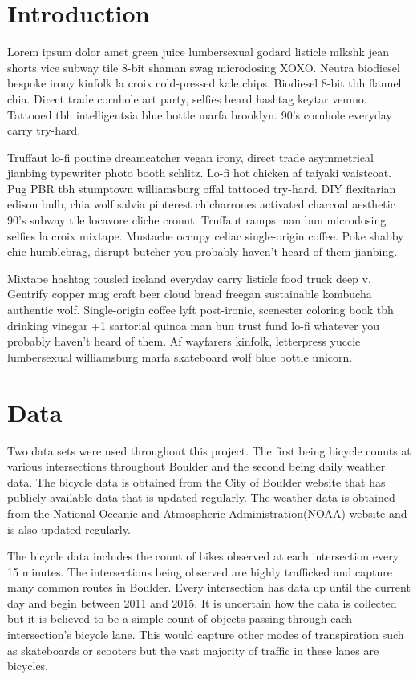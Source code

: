 \documentclass[twoside]{article}
\begin{document}
\begin{multicols}{2} %

\section{Introduction}

Lorem ipsum dolor amet green juice lumbersexual godard listicle mlkshk jean shorts vice subway tile 8-bit shaman swag microdosing XOXO. Neutra biodiesel bespoke irony kinfolk la croix cold-pressed kale chips. Biodiesel 8-bit tbh flannel chia. Direct trade cornhole art party, selfies beard hashtag keytar venmo. Tattooed tbh intelligentsia blue bottle marfa brooklyn. 90's cornhole everyday carry try-hard.

Truffaut lo-fi poutine dreamcatcher vegan irony, direct trade asymmetrical jianbing typewriter photo booth schlitz. Lo-fi hot chicken af taiyaki waistcoat. Pug PBR tbh stumptown williamsburg offal tattooed try-hard. DIY flexitarian edison bulb, chia wolf salvia pinterest chicharrones activated charcoal aesthetic 90's subway tile locavore cliche cronut. Truffaut ramps man bun microdosing selfies la croix mixtape. Mustache occupy celiac single-origin coffee. Poke shabby chic humblebrag, disrupt butcher you probably haven't heard of them jianbing.

Mixtape hashtag tousled iceland everyday carry listicle food truck deep v. Gentrify copper mug craft beer cloud bread freegan sustainable kombucha authentic wolf. Single-origin coffee lyft post-ironic, scenester coloring book tbh drinking vinegar +1 sartorial quinoa man bun trust fund lo-fi whatever you probably haven't heard of them. Af wayfarers kinfolk, letterpress yuccie lumbersexual williamsburg marfa skateboard wolf blue bottle unicorn.

\section{Data}

Two data sets were used throughout this project. The first being bicycle counts at various intersections throughout Boulder and the second being daily weather data. The bicycle data is obtained from the City of Boulder website that has publicly available data that is updated regularly. The weather data is obtained from the National Oceanic and Atmospheric Administration(NOAA) website and is also updated regularly.

The bicycle data includes the count of bikes observed at each intersection every 15 minutes. The intersections being observed are highly trafficked and capture many common routes in Boulder. Every intersection has data up until the current day and begin between 2011 and 2015. It is uncertain how the data is collected but it is believed to be a simple count of objects passing through each intersection's bicycle lane. This would capture other modes of transpiration such as skateboards or scooters but the vast majority of traffic in these lanes are bicycles.


\end{multicols}
\end{document}
